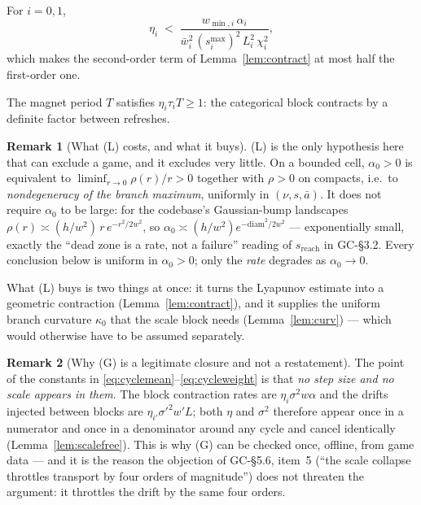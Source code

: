 \documentclass[11pt]{article}
\theoremstyle{definition}
\newtheorem{remark}{Remark}
\newcommand{\GC}[1]{\textsf{GC-#1}}
\begin{document}
\begin{conditions}
\item[\textbf{(S$^+$) Explicit step sizes.}] For $i = 0, 1$,
  \begin{equation}\label{eq:step}
    \eta_i \;<\; \frac{w_{\min,i}\,\alpha_i}
                      {\bar w_i^2\, (s^{\max}_i)^2\, L_i^2\, \chi_i^2},
  \end{equation}
  which makes the second-order term of Lemma~\ref{lem:contract} at most half the
  first-order one.

\item[\textbf{(T) Refresh separation.}] The magnet period $T$ satisfies
  $\eta_i\tau_i T \ge 1$: the categorical block contracts by a definite factor
  between refreshes.
\end{conditions}

\begin{remark}[What (L) costs, and what it buys]\label{rem:L}
(L) is the only hypothesis here that can exclude a game, and it excludes very
little. On a bounded cell, $\alpha_0 > 0$ is equivalent to
$\liminf_{r \to 0}\rho(r)/r > 0$ together with $\rho > 0$ on compacts, i.e.\ to
\emph{nondegeneracy of the branch maximum}, uniformly in $(\nu,s,\bar a)$. It
does not require $\alpha_0$ to be large: for the codebase's Gaussian-bump
landscapes $\rho(r) \asymp (h/w^2)\,r\,e^{-r^2/2w^2}$, so
$\alpha_0 \asymp (h/w^2)e^{-\mathrm{diam}^2/2w^2}$ --- exponentially small, exactly
the ``dead zone is a rate, not a failure'' reading of $s_{\mathrm{reach}}$ in
\GC{\S3.2}. Every conclusion below is uniform in $\alpha_0 > 0$; only the
\emph{rate} degrades as $\alpha_0 \to 0$.

What (L) buys is two things at once: it turns the Lyapunov estimate into a
geometric contraction (Lemma~\ref{lem:contract}), and it supplies the uniform
branch curvature $\kappa_0$ that the scale block needs
(Lemma~\ref{lem:curv}) --- which would otherwise have to be assumed separately.
\end{remark}

\begin{remark}[Why (G) is a legitimate closure and not a restatement]
\label{rem:G}
The point of the constants in \eqref{eq:cyclemean}--\eqref{eq:cycleweight} is
that \emph{no step size and no scale appears in them}. The block contraction
rates are $\eta_i \sigma^2 w \alpha$ and the drifts injected between blocks are
$\eta_{i'}\sigma'^2 w' L$; both $\eta$ and $\sigma^2$ therefore appear once in a
numerator and once in a denominator around any cycle and cancel identically
(Lemma~\ref{lem:scalefree}). This is why (G) can be checked once, offline, from
game data --- and it is the reason the objection of \GC{\S5.6}, item~5 (``the
scale collapse throttles transport by four orders of magnitude'') does not
threaten the argument: it throttles the drift by the same four orders.
\end{remark}
\end{document}
